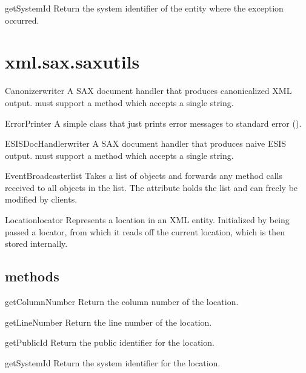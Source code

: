 \documentclass{howto}
\begin{document}
\begin{methoddesc}{getSystemId}{}
Return the system identifier of the entity where the exception occurred.
\end{methoddesc}


\section{{xml.sax.saxutils}}

\begin{classdesc}{Canonizer}{writer}
A SAX document handler that produces canonicalized XML output.
 must support a  method which accepts a
single string.  
\end{classdesc}

\begin{classdesc}{ErrorPrinter}{}
A simple class that just prints error messages to standard error ().
\end{classdesc}

\begin{classdesc}{ESISDocHandler}{writer}
A SAX document handler that produces naive ESIS output.
 must support a  method which accepts a single string. 
\end{classdesc}

\begin{classdesc}{EventBroadcaster}{list}
Takes a list of objects and forwards any method calls received
    to all objects in the list. The attribute  holds the list and
    can freely be modified by clients.
\end{classdesc}

\begin{classdesc}{Location}{locator}
Represents a location in an XML entity. Initialized by being passed
a locator, from which it reads off the current location, which is then
stored internally.
\end{classdesc}

\subsection{ methods}

\begin{methoddesc}{getColumnNumber}{}
Return the column number of the location.
\end{methoddesc}

\begin{methoddesc}{getLineNumber}{}
Return the line number of the location.
\end{methoddesc}

\begin{methoddesc}{getPublicId}{}
Return the public identifier for the location.
\end{methoddesc}

\begin{methoddesc}{getSystemId}{}
Return the system identifier for the location.
\end{methoddesc}
\end{document}
